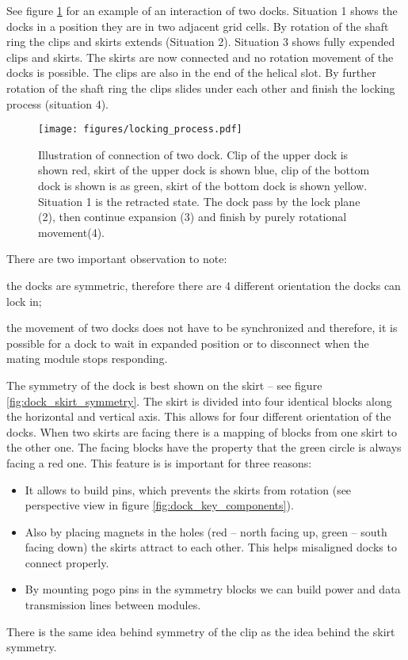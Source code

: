 See figure \ref{fig:dock_locking_process} for an example of an interaction of
two docks. Situation 1 shows the docks in a position they are in two adjacent
grid cells. By rotation of the shaft ring the clips and skirts extends
(Situation 2). Situation 3 shows fully expended clips and skirts. The skirts are
now connected and no rotation movement of the docks is possible. The clips are
also in the end of the helical slot. By further rotation of the shaft ring the
clips slides under each other and finish the locking process (situation 4).

\begin{figure}[h!]
    \centering
    \texttt{[image: figures/locking\_process.pdf]}
    \caption{Illustration of connection of two dock. Clip of the upper dock is
    shown red, skirt of the upper dock is shown blue, clip of the bottom dock is
    shown is as green, skirt of the bottom dock is shown yellow.  Situation 1 is
    the retracted state. The dock pass by the lock plane (2), then continue
    expansion (3) and finish by purely rotational movement(4). }
    \label{fig:dock_locking_process}
\end{figure}

There are two important observation to note:
\begin{enumerate*}
    \item the docks are symmetric, therefore there are 4 different orientation
    the docks can lock in;
    \item the movement of two docks does not have to be synchronized and
    therefore, it is possible for a dock to wait in expanded position or to
    disconnect when the mating module stops responding.
\end{enumerate*}

The symmetry of the dock is best shown on the skirt -- see figure
\ref{fig:dock_skirt_symmetry}. The skirt is divided into four identical blocks
along the horizontal and vertical axis. This allows for four different
orientation of the docks. When two skirts are facing there is a mapping of
blocks from one skirt to the other one. The facing blocks have the property that
the green circle is always facing a red one. This feature is is important for
three reasons:
\begin{itemize}
    \item It allows to build pins, which prevents the skirts from rotation (see
    perspective view in figure \ref{fig:dock_key_components}).
    \item Also by placing magnets in the holes (red -- north facing up, green --
    south facing down) the skirts attract to each other. This helps misaligned
    docks to connect properly.
    \item By mounting pogo pins  in the symmetry blocks we can build
    power and data transmission lines between modules.
\end{itemize}
There is the same idea behind symmetry of the clip as the idea behind the skirt
symmetry.

